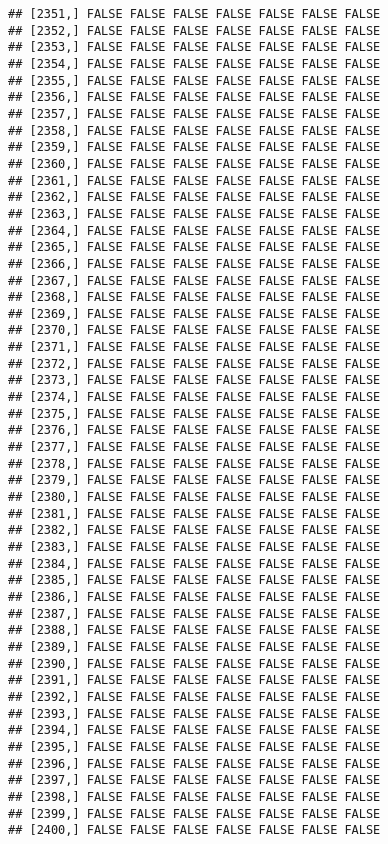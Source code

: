 \documentclass[
]{article}
\begin{document}
\begin{verbatim}
## [2351,] FALSE FALSE FALSE FALSE FALSE FALSE FALSE
## [2352,] FALSE FALSE FALSE FALSE FALSE FALSE FALSE
## [2353,] FALSE FALSE FALSE FALSE FALSE FALSE FALSE
## [2354,] FALSE FALSE FALSE FALSE FALSE FALSE FALSE
## [2355,] FALSE FALSE FALSE FALSE FALSE FALSE FALSE
## [2356,] FALSE FALSE FALSE FALSE FALSE FALSE FALSE
## [2357,] FALSE FALSE FALSE FALSE FALSE FALSE FALSE
## [2358,] FALSE FALSE FALSE FALSE FALSE FALSE FALSE
## [2359,] FALSE FALSE FALSE FALSE FALSE FALSE FALSE
## [2360,] FALSE FALSE FALSE FALSE FALSE FALSE FALSE
## [2361,] FALSE FALSE FALSE FALSE FALSE FALSE FALSE
## [2362,] FALSE FALSE FALSE FALSE FALSE FALSE FALSE
## [2363,] FALSE FALSE FALSE FALSE FALSE FALSE FALSE
## [2364,] FALSE FALSE FALSE FALSE FALSE FALSE FALSE
## [2365,] FALSE FALSE FALSE FALSE FALSE FALSE FALSE
## [2366,] FALSE FALSE FALSE FALSE FALSE FALSE FALSE
## [2367,] FALSE FALSE FALSE FALSE FALSE FALSE FALSE
## [2368,] FALSE FALSE FALSE FALSE FALSE FALSE FALSE
## [2369,] FALSE FALSE FALSE FALSE FALSE FALSE FALSE
## [2370,] FALSE FALSE FALSE FALSE FALSE FALSE FALSE
## [2371,] FALSE FALSE FALSE FALSE FALSE FALSE FALSE
## [2372,] FALSE FALSE FALSE FALSE FALSE FALSE FALSE
## [2373,] FALSE FALSE FALSE FALSE FALSE FALSE FALSE
## [2374,] FALSE FALSE FALSE FALSE FALSE FALSE FALSE
## [2375,] FALSE FALSE FALSE FALSE FALSE FALSE FALSE
## [2376,] FALSE FALSE FALSE FALSE FALSE FALSE FALSE
## [2377,] FALSE FALSE FALSE FALSE FALSE FALSE FALSE
## [2378,] FALSE FALSE FALSE FALSE FALSE FALSE FALSE
## [2379,] FALSE FALSE FALSE FALSE FALSE FALSE FALSE
## [2380,] FALSE FALSE FALSE FALSE FALSE FALSE FALSE
## [2381,] FALSE FALSE FALSE FALSE FALSE FALSE FALSE
## [2382,] FALSE FALSE FALSE FALSE FALSE FALSE FALSE
## [2383,] FALSE FALSE FALSE FALSE FALSE FALSE FALSE
## [2384,] FALSE FALSE FALSE FALSE FALSE FALSE FALSE
## [2385,] FALSE FALSE FALSE FALSE FALSE FALSE FALSE
## [2386,] FALSE FALSE FALSE FALSE FALSE FALSE FALSE
## [2387,] FALSE FALSE FALSE FALSE FALSE FALSE FALSE
## [2388,] FALSE FALSE FALSE FALSE FALSE FALSE FALSE
## [2389,] FALSE FALSE FALSE FALSE FALSE FALSE FALSE
## [2390,] FALSE FALSE FALSE FALSE FALSE FALSE FALSE
## [2391,] FALSE FALSE FALSE FALSE FALSE FALSE FALSE
## [2392,] FALSE FALSE FALSE FALSE FALSE FALSE FALSE
## [2393,] FALSE FALSE FALSE FALSE FALSE FALSE FALSE
## [2394,] FALSE FALSE FALSE FALSE FALSE FALSE FALSE
## [2395,] FALSE FALSE FALSE FALSE FALSE FALSE FALSE
## [2396,] FALSE FALSE FALSE FALSE FALSE FALSE FALSE
## [2397,] FALSE FALSE FALSE FALSE FALSE FALSE FALSE
## [2398,] FALSE FALSE FALSE FALSE FALSE FALSE FALSE
## [2399,] FALSE FALSE FALSE FALSE FALSE FALSE FALSE
## [2400,] FALSE FALSE FALSE FALSE FALSE FALSE FALSE

\end{verbatim}
\end{document}
